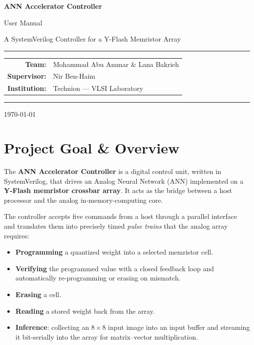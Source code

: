 \documentclass[11pt,a4paper]{article}
\begin{document}
\begin{titlepage}
\centering
\vspace*{1.5cm}
{\color{techblue}\Huge\bfseries ANN Accelerator Controller\par}
\vspace{0.5cm}
{\Large User Manual\par}
\vspace{0.3cm}
{\large A SystemVerilog Controller for a Y-Flash Memristor Array\par}
\vspace{2cm}
\rule{\textwidth}{0.8pt}\par
\vspace{0.6cm}
{\large
\begin{tabular}{rl}
\textbf{Team:} & Mohammad Abu Ammar \& Lana Bakrieh \\[4pt]
\textbf{Supervisor:} & Nir Ben-Haim \\[4pt]
\textbf{Institution:} & Technion --- VLSI Laboratory \\
\end{tabular}\par}
\vspace{0.6cm}
\rule{\textwidth}{0.8pt}\par
\vfill
{\large \today\par}
\end{titlepage}

\tableofcontents
\newpage

\section{Project Goal \& Overview}

The \textbf{ANN Accelerator Controller} is a digital control unit, written in
SystemVerilog, that drives an Analog Neural Network (ANN) implemented on a
\textbf{Y-Flash memristor crossbar array}. It acts as the bridge between a host
processor and the analog in-memory-computing core.

The controller accepts five commands from a host through a parallel interface
and translates them into precisely timed \emph{pulse trains} that the analog
array requires:

\begin{itemize}[leftmargin=1.4em]
  \item \textbf{Programming} a quantized weight into a selected memristor cell.
  \item \textbf{Verifying} the programmed value with a closed feedback loop and
        automatically re-programming or erasing on mismatch.
  \item \textbf{Erasing} a cell.
  \item \textbf{Reading} a stored weight back from the array.
  \item \textbf{Inference}: collecting an $8\times8$ input image into an input
        buffer and streaming it bit-serially into the array for
        matrix--vector multiplication.
\end{itemize}
\end{document}
